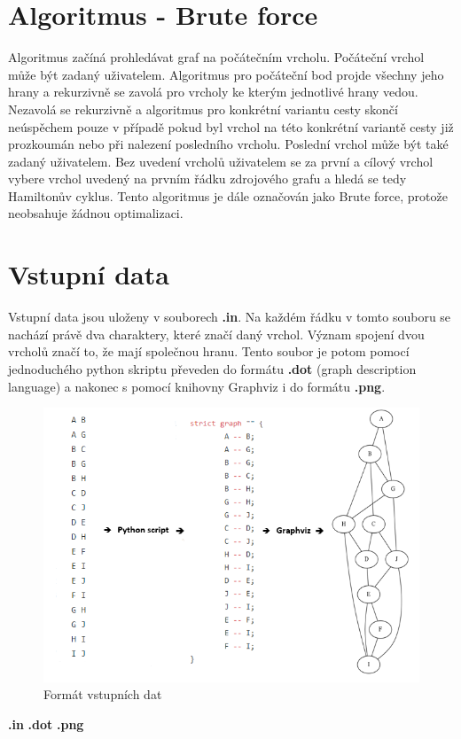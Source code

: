 \documentclass[a4paper,11pt]{article}
\begin{document}
\section{Algoritmus - Brute force}

Algoritmus začíná prohledávat graf na počátečním vrcholu. Počáteční vrchol může být zadaný uživatelem. Algoritmus pro počáteční bod projde všechny jeho hrany a rekurzivně se zavolá pro vrcholy ke kterým jednotlivé hrany vedou. Nezavolá se rekurzivně a algoritmus pro konkrétní variantu cesty skončí neúspěchem pouze v případě pokud byl vrchol na této konkrétní variantě cesty již prozkoumán nebo při nalezení posledního vrcholu. Poslední vrchol může být také zadaný uživatelem. Bez uvedení vrcholů uživatelem se za první a cílový vrchol vybere vrchol uvedený na prvním řádku zdrojového grafu a hledá se tedy Hamiltonův cyklus. Tento algoritmus je dále označován jako Brute force, protože neobsahuje žádnou optimalizaci.

\section{Vstupní data}

Vstupní data jsou uloženy v souborech \textbf{.in}. Na každém řádku v tomto souboru se nachází právě dva charaktery, které značí daný vrchol. Význam spojení dvou vrcholů značí to, že mají společnou hranu. Tento soubor je potom pomocí jednoduchého python skriptu převeden do formátu \textbf{.dot} (graph description language) a nakonec s pomocí knihovny Graphviz\cite{graphviz} i do formátu \textbf{.png}.

\newpage

\begin{figure}[!h]
\caption{Formát vstupních dat}
\includegraphics[]{./inputData.png}
\centering
\end{figure}
\hspace{1,75cm}\textbf{\LARGE{.in}} \hspace{4cm} \textbf{\LARGE{.dot}} \hspace{3,8cm} \textbf{\LARGE{.png}}
\end{document}
